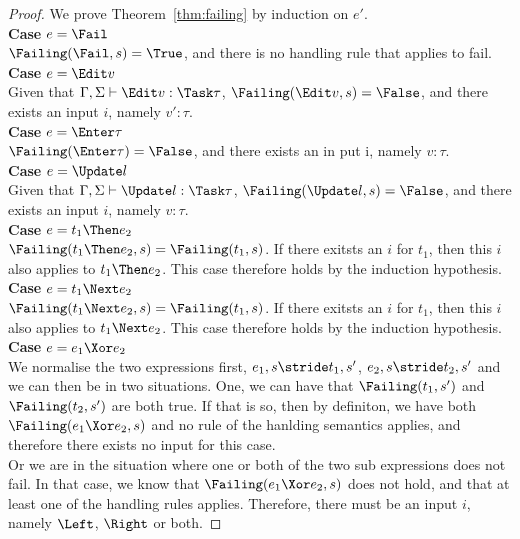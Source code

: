 \begin{proof}

  We prove Theorem~\ref{thm:failing} by induction on $e'$.\\

  \noindent\textbf{Case} $e = \Fail$\\
  $\Failing(\Fail,s)=\True$, and there is no handling rule that applies to fail.\\

  \noindent\textbf{Case} $e = \Edit v$\\
   Given that $\Gamma,\Sigma\infers\Edit v:\Task\tau$, $\Failing(\Edit v,s)=\False$, and there exists an input $i$, namely $v':\tau$.\\

  \noindent\textbf{Case} $e = \Enter \tau$\\
  $\Failing(\Enter \tau)=\False$, and there exists an in put i, namely $v:\tau$.\\

  \noindent\textbf{Case} $e = \Update l$\\
  Given that $\Gamma,\Sigma\infers\Update l:\Task\tau$, $\Failing(\Update l,s)=\False$, and there exists an input $i$, namely $v:\tau$.\\

  \noindent\textbf{Case} $e = t_1\Then e_2$\\
   $\Failing(t_1\Then e_2,s)=\Failing(t_1,s)$. If there exitsts an $i$ for $t_1$, then this $i$ also applies to $t_1\Then e_2$. This case therefore holds by the induction hypothesis.\\

  \noindent\textbf{Case} $e = t_1\Next e_2$\\
   $\Failing(t_1\Next e_2,s)=\Failing(t_1,s)$. If there exitsts an $i$ for $t_1$, then this $i$ also applies to $t_1\Next e_2$. This case therefore holds by the induction hypothesis.\\

  \noindent\textbf{Case} $e = e_1\Xor e_2$\\
   We normalise the two expressions first, $e_1,s\stride t_1,s'$, $e_2,s\stride t_2,s'$ and we can then be in two situations. One, we can have that $\Failing(t_1,s')$ and $\Failing(t_2,s')$ are both true. If that is so, then by definiton, we have both $\Failing(e_1\Xor e_2,s)$ and no rule of the hanlding semantics applies, and therefore there exists no input for this case.\\
                                           Or we are in the situation where one or both of the two sub expressions does not fail. In that case, we know that $\Failing(e_1\Xor e_2,s)$ does not hold, and that at least one of the handling rules applies. Therefore, there must be an input $i$, namely $\Left$, $\Right$ or both.


\end{proof}
